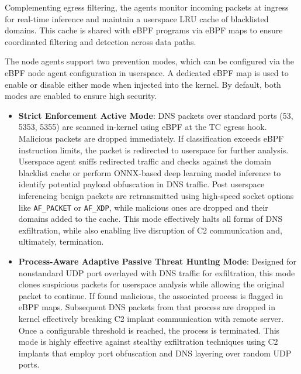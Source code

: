 \documentclass [11pt, proquest] {uwthesis}[2020/02/24]
\begin{document}
Complementing egress filtering, the agents monitor incoming packets at ingress for real-time inference and maintain a userspace LRU cache of blacklisted domains. This cache is shared with eBPF programs via eBPF maps to ensure coordinated filtering and detection across data paths.

The node agents support two prevention modes, which can be configured via the eBPF node agent configuration in userspace. A dedicated eBPF map is used to enable or disable either mode when injected into the kernel. By default, both modes are enabled to ensure high security.

\begin{itemize}[itemsep=1pt,parsep=0pt]
    \item \textbf{Strict Enforcement Active Mode}: DNS packets over standard ports (53, 5353, 5355) are scanned in-kernel using eBPF at the TC egress hook. Malicious packets are dropped immediately. If classification exceeds eBPF instruction limits, the packet is redirected to userspace for further analysis. Userspace agent sniffs redirected traffic and checks against the domain blacklist cache or perform ONNX-based deep learning model inference to identify potential payload obfuscation in DNS traffic. Post userspace inferencing benign packets are retransmitted using high-speed socket options like \texttt{AF\_PACKET} or \texttt{AF\_XDP}, while malicious ones are dropped and their domains added to the cache. This mode effectively halts all forms of DNS exfiltration, while also enabling live disruption of C2 communication and, ultimately, termination.
    
    \item \textbf{Process-Aware Adaptive Passive Threat Hunting Mode}: Designed for nonstandard UDP port overlayed with DNS traffic for exfiltration, this mode clones suspicious packets for userspace analysis while allowing the original packet to continue. If found malicious, the associated process is flagged in eBPF maps. Subsequent DNS packets from that process are dropped in kernel effectively breaking C2 implant communication with remote server. Once a configurable threshold is reached, the process is terminated. This mode is highly effective against stealthy exfiltration techniques using C2 implants that employ port obfuscation and DNS layering over random UDP ports. 
\end{itemize}
\end{document}
